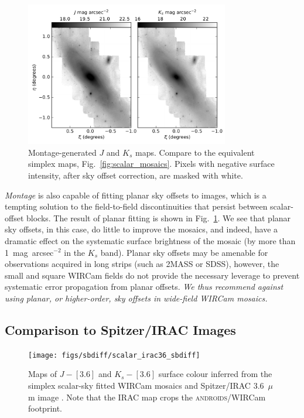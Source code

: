 \documentclass[iop]{emulateapj}
\newcommand{\sw}[1]{\textit{#1}} %
\newcommand{\androids}{\textsc{androids}}
\newcommand{\Fig}[1]{Fig.~\ref{fig:#1}}  %
\begin{document}
\begin{figure}[t]
\centering
\includegraphics[width=3.5in]{figs/montage_planar_mosaics}
\caption{Montage-generated $J$ and $K_s$ maps. Compare to the equivalent simplex maps, \Fig{scalar_mosaics}. Pixels with negative surface intensity, after sky offset correction, are masked with white.}
\label{fig:montage_planar_mosaics}
\end{figure}

\sw{Montage} is also capable of fitting planar sky offsets to images, which is a tempting solution to the field-to-field discontinuities that persist between scalar-offset blocks.
The result of planar fitting is shown in \Fig{montage_planar_mosaics}.
We see that planar sky offsets, in this case, do little to improve the mosaics, and indeed, have a dramatic effect on the systematic surface brightness of the mosaic (by more than 1~mag~arcsec$^{-2}$ in the $K_s$ band).
Planar sky offsets may be amenable for observations acquired in long strips (such as 2MASS or SDSS), however, the small and square WIRCam fields do not provide the necessary leverage to prevent systematic error propagation from planar offsets.
\textit{We thus recommend against using planar, or higher-order, sky offsets in wide-field WIRCam mosaics.}

\subsection{Comparison to Spitzer/IRAC Images}

\begin{figure}[t]
\centering
\texttt{[image: figs/sbdiff/scalar\_irac36\_sbdiff]}
\caption{Maps of $J-[3.6]$ and $K_s-[3.6]$ surface colour inferred from the simplex scalar-sky fitted WIRCam mosaics and Spitzer/IRAC 3.6~$\mu$m image \citep{Barmby:2006}.
Note that the IRAC map crops the \androids/WIRCam footprint.}
\label{fig:scalar_irac36_sbdiff}
\end{figure}
\end{document}
